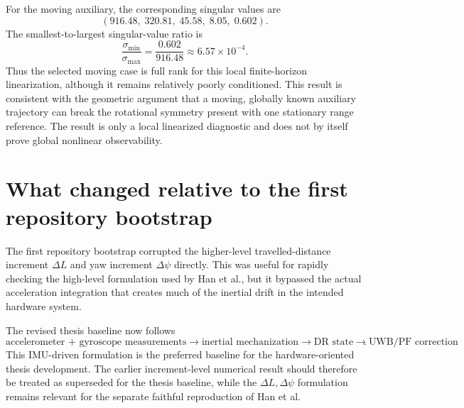 For the moving auxiliary, the corresponding singular values are
\begin{equation}
(916.48,\;320.81,\;45.58,\;8.05,\;0.602).
\end{equation}
The smallest-to-largest singular-value ratio is
\begin{equation}
\frac{\sigma_{\min}}{\sigma_{\max}}
=\frac{0.602}{916.48}
\approx 6.57\times10^{-4}.
\end{equation}
Thus the selected moving case is full rank for this local finite-horizon linearization, although it remains relatively poorly conditioned. This result is consistent with the geometric argument that a moving, globally known auxiliary trajectory can break the rotational symmetry present with one stationary range reference. The result is only a local linearized diagnostic and does not by itself prove global nonlinear observability.

\section{What changed relative to the first repository bootstrap}
The first repository bootstrap corrupted the higher-level travelled-distance increment $\Delta L$ and yaw increment $\Delta\psi$ directly. This was useful for rapidly checking the high-level formulation used by Han et al., but it bypassed the actual acceleration integration that creates much of the inertial drift in the intended hardware system.

The revised thesis baseline now follows
\begin{equation}
\boxed{
\text{accelerometer + gyroscope measurements}
\rightarrow
\text{inertial mechanization}
\rightarrow
\text{DR state}
\rightarrow
\text{UWB/PF correction}
}.
\end{equation}
This IMU-driven formulation is the preferred baseline for the hardware-oriented thesis development. The earlier increment-level numerical result should therefore be treated as superseded for the thesis baseline, while the $\Delta L,\Delta\psi$ formulation remains relevant for the separate faithful reproduction of Han et al.

